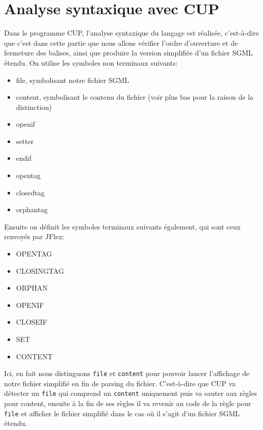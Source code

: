 \documentclass[a4paper]{article}
\begin{document}
\section{Analyse syntaxique avec CUP}
Dans le programme CUP, l'analyse syntaxique du langage est réalisée, c'est-à-dire que c'est dans cette partie que nous allons vérifier l'ordre d'ouverture et de fermeture des balises, ainsi que produire la version simplifiée d'un fichier SGML étendu.
On utilise les symboles non terminaux suivants:
\begin{itemize}
	\item file, symbolisant notre fichier SGML
	\item content, symbolisant le contenu du fichier (voir plus bas pour la raison de la distinction)
	\item openif
	\item setter
	\item endif
	\item opentag
	\item closedtag
	\item orphantag
\end{itemize}
Ensuite on définit les symboles terminaux suivants également, qui sont ceux renvoyés par JFlex:
\begin{itemize}
	\item OPENTAG
	\item CLOSINGTAG
	\item ORPHAN
	\item OPENIF
	\item CLOSEIF
	\item SET
	\item CONTENT \\
\end{itemize}

Ici, en fait nous distinguons \verb+file+ et \verb+content+ pour pouvoir lancer l'affichage de notre fichier simplifié en fin de parsing du fichier. C'est-à-dire que CUP va détecter un \verb+file+ qui comprend un \verb+content+ uniquement puis va sauter aux règles pour content, ensuite à la fin de ses règles il va revenir au code de la règle pour \verb+file+ et afficher le fichier simplifié dans le cas où il s'agit d'un fichier SGML étendu.
\end{document}
